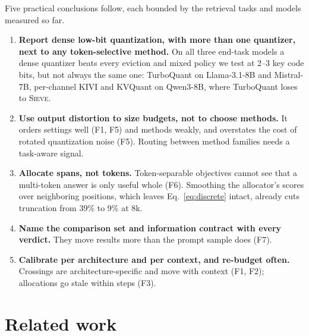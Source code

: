 \documentclass{article}
\newcommand{\sieve}{\textsc{Sieve}}
\theoremstyle{definition}
\begin{document}
Five practical conclusions follow, each bounded by the retrieval tasks and models measured so far.
\begin{enumerate}[leftmargin=*,itemsep=1pt,topsep=2pt]
  \item \textbf{Report dense low-bit quantization, with more than one quantizer, next to any token-selective method.}  On all three end-task models a dense quantizer beats every eviction and mixed policy we test at 2--3 key code bits, but not always the same one: TurboQuant on Llama-3.1-8B and Mistral-7B, per-channel KIVI and KVQuant on Qwen3-8B, where TurboQuant loses to \sieve{}.
  \item \textbf{Use output distortion to size budgets, not to choose methods.}  It orders settings well (F1, F5) and methods weakly, and overstates the cost of rotated quantization noise (F5).  Routing between method families needs a task-aware signal.
  \item \textbf{Allocate spans, not tokens.}  Token-separable objectives cannot see that a multi-token answer is only useful whole (F6).  Smoothing the allocator's scores over neighboring positions, which leaves Eq.~\ref{eq:discrete} intact, already cuts truncation from 39\% to 9\% at 8k.
  \item \textbf{Name the comparison set and information contract with every verdict.}  They move results more than the prompt sample does (F7).
  \item \textbf{Calibrate per architecture and per context, and re-budget often.}  Crossings are architecture-specific and move with context (F1, F2); allocations go stale within steps (F3).
\end{enumerate}


\section{Related work}
\label{sec:related}
\end{document}
